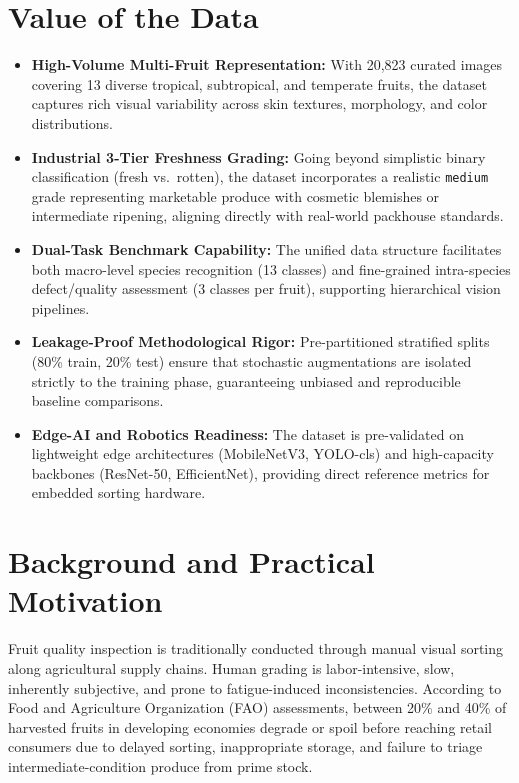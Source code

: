 \documentclass[11pt,a4paper]{article}
\begin{document}
\section{Value of the Data}

\begin{itemize}
    \item \textbf{High-Volume Multi-Fruit Representation:} With 20,823 curated images covering 13 diverse tropical, subtropical, and temperate fruits, the dataset captures rich visual variability across skin textures, morphology, and color distributions.
    \item \textbf{Industrial 3-Tier Freshness Grading:} Going beyond simplistic binary classification (fresh vs.\ rotten), the dataset incorporates a realistic \texttt{medium} grade representing marketable produce with cosmetic blemishes or intermediate ripening, aligning directly with real-world packhouse standards.
    \item \textbf{Dual-Task Benchmark Capability:} The unified data structure facilitates both macro-level species recognition (13 classes) and fine-grained intra-species defect/quality assessment (3 classes per fruit), supporting hierarchical vision pipelines.
    \item \textbf{Leakage-Proof Methodological Rigor:} Pre-partitioned stratified splits (80\% train, 20\% test) ensure that stochastic augmentations are isolated strictly to the training phase, guaranteeing unbiased and reproducible baseline comparisons.
    \item \textbf{Edge-AI and Robotics Readiness:} The dataset is pre-validated on lightweight edge architectures (MobileNetV3, YOLO-cls) and high-capacity backbones (ResNet-50, EfficientNet), providing direct reference metrics for embedded sorting hardware.
\end{itemize}

\section{Background and Practical Motivation}
Fruit quality inspection is traditionally conducted through manual visual sorting along agricultural supply chains. Human grading is labor-intensive, slow, inherently subjective, and prone to fatigue-induced inconsistencies. According to Food and Agriculture Organization (FAO) assessments, between 20\% and 40\% of harvested fruits in developing economies degrade or spoil before reaching retail consumers due to delayed sorting, inappropriate storage, and failure to triage intermediate-condition produce from prime stock.
\end{document}
